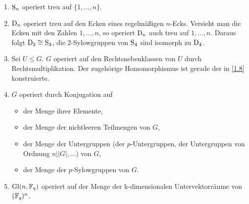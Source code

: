 \begin{beispiel} \spspace
 \begin{enumerate}
  \item $\operatorname{S}_n$ operiert treu auf $\lbrace 1,\ldots,n \rbrace$.
  \item $\operatorname{D}_n$ operiert treu auf den Ecken eines regelm\"a\ss{}igen $n$-Ecks. Versieht man die Ecken mit den Zahlen $1,\ldots,n$, so operiert $\operatorname{D}_n$ auch treu auf $1,\ldots,n$. Daraus folgt $\operatorname{D}_3 \cong \operatorname{S}_3$, die $2$-Sylowgruppen von $\operatorname{S}_4$ sind isomorph zu $\operatorname{D}_4$.
  \item Sei $U\leq G$. $G$ operiert auf den Rechtsnebenklassen von $U$ durch Rechtsmultiplikation. Der zugeh\"orige Homomorphismus ist gerade der in \ref{1.8} konstruierte.
  \item \label{klaus}\label{5.2.4}$G$ operiert durch Konjugation auf 
   \begin{itemize}
    \item der Menge ihrer Elemente,
    \item der Menge der nichtleeren Teilmengen von $G$,
    \item der Menge der Untergruppen (der $p$-Untergruppen, der Untergruppen von Ordnung $n||G|,\ldots$) von $G$,
    \item der Menge der $p$-Sylowgruppen von $G$.
   \end{itemize}
  \item $\operatorname{Gl}(n,\mathbb{F}_q)$ operiert auf der Menge der k-dimensionalen Untervektor\-r\"aume von $(\mathbb{F}_q)^n$.

 \end{enumerate}

 
\end{beispiel}


